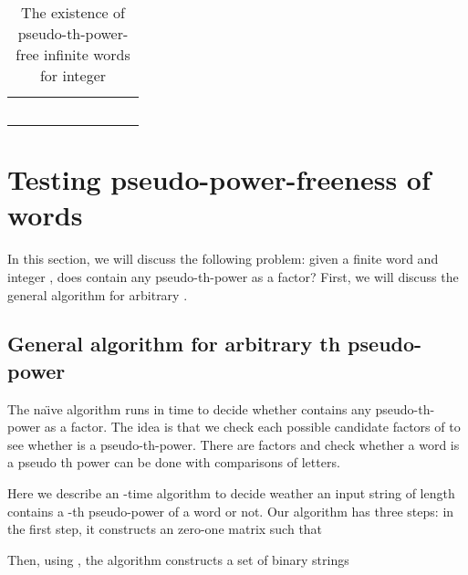 \documentclass[12pt]{article}
\begin{document}
\begin{table}
\centering \caption{The existence of pseudo-th-power-free
infinite words for integer }
\begin{tabular}{c|p{5.5ex}p{5.5ex}p{5.5ex}p{5.5ex}p{5.5ex}p{5.5ex}p{5.5ex}p{5.5ex}}
  \hline
 &  &  &  &  &  &  &  &  \\
  \hline
   &  &  &  &  &  &  &  &  \\
   &  &  &  &  &  &  &  &  \\
   &  &  &  &  &  &  &  &  \\
   &  &  &  &  &  &  &  &  \\
   &  &  &  &  &  &  &  &  \\
  \hline
\end{tabular}\label{table:pseudoforth}
\end{table}



\section{Testing pseudo-power-freeness of words}\label{section:decision}
In this section, we will discuss the following problem: given a
finite word  and integer , does  contain any
pseudo-th-power as a factor? First, we will discuss the general
algorithm for arbitrary .


\subsection{General algorithm for arbitrary th pseudo-power}
The na\"\i ve algorithm runs in  time to decide whether 
contains any pseudo-th-power as a factor. The idea is that we
check each possible candidate factors  of  to see whether 
is a pseudo-th-power. There are  factors and check
whether a word is a pseudo th power can be done with 
comparisons of letters.


    Here we describe an -time algorithm to decide weather an input string  of length 
    contains a -th pseudo-power of a word or not.
Our algorithm has three steps: in the first step, it constructs an  zero-one matrix  such that
    
Then, using , the algorithm constructs a set of binary strings
    
\end{document}
